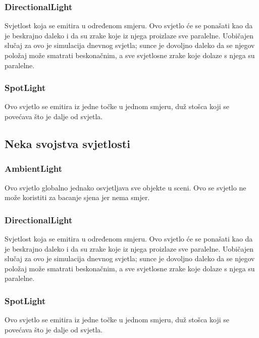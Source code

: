 \documentclass[a4paper,12pt]{article}
\begin{document}
\subsubsection{DirectionalLight}
\hspace{10mm} Svjetlost koja se emitira u određenom smjeru. Ovo svjetlo će se ponašati kao da je beskrajno daleko i da su zrake koje iz njega proizlaze sve paralelne. Uobičajen slučaj za ovo je simulacija dnevnog svjetla; sunce je dovoljno daleko da se njegov položaj može smatrati beskonačnim, a sve svjetlosne zrake koje dolaze s njega su paralelne.

\subsubsection{SpotLight}
\hspace{10mm} Ovo svjetlo se emitira iz jedne točke u jednom smjeru, duž stošca koji se povećava što je dalje od svjetla.

\pagebreak
\subsection{Neka svojstva svjetlosti}
\subsubsection{AmbientLight}
\hspace{10mm} Ovo svjetlo globalno jednako osvjetljava sve objekte u sceni.
Ovo se svjetlo ne može koristiti za bacanje sjena jer nema smjer.

\subsubsection{DirectionalLight}
\hspace{10mm} Svjetlost koja se emitira u određenom smjeru. Ovo svjetlo će se ponašati kao da je beskrajno daleko i da su zrake koje iz njega proizlaze sve paralelne. Uobičajen slučaj za ovo je simulacija dnevnog svjetla; sunce je dovoljno daleko da se njegov položaj može smatrati beskonačnim, a sve svjetlosne zrake koje dolaze s njega su paralelne.

\subsubsection{SpotLight}
\hspace{10mm} Ovo svjetlo se emitira iz jedne točke u jednom smjeru, duž stošca koji se povećava što je dalje od svjetla.
\end{document}
